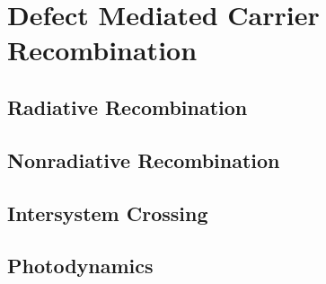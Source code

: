 \section{Defect Mediated Carrier Recombination}

\subsection{Radiative Recombination}


\subsection{Nonradiative Recombination}


\subsection{Intersystem Crossing}


\subsection{Photodynamics}


